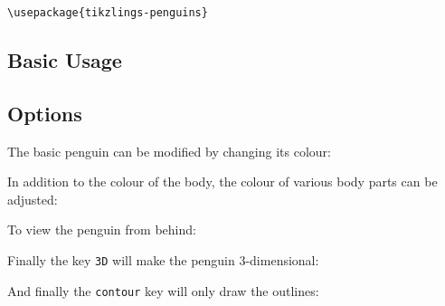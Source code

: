 \documentclass[parskip=half]{scrartcl}
\begin{document}
\begin{tcolorbox}[lower separated=false, lefthand width=.8\linewidth]
\vspace*{0.5cm}
\lstinline|\usepackage{tikzlings-penguins}| 
\vspace*{0.5cm}
\end{tcolorbox}

\subsection{Basic Usage}

\begin{tcblisting}{}
\penguin
\end{tcblisting}

\subsection{Options}

The basic penguin can be modified by changing its colour:
\begin{tcblisting}{}
\penguin[body=blue]
\end{tcblisting}

In addition to the colour of the body, the colour of various body parts can be adjusted:
\begin{tcblisting}{}
\penguin[eye=red]
\end{tcblisting}
\begin{tcblisting}{}
\penguin[pupil=red]
\end{tcblisting}
\begin{tcblisting}{}
\penguin[bill=red]
\end{tcblisting}
\begin{tcblisting}{}
\penguin[belly=red]
\end{tcblisting}
\begin{tcblisting}{}
\penguin[feet=red]
\end{tcblisting}

To view the penguin from behind:
\begin{tcblisting}{}
\penguin[back]
\end{tcblisting}

Finally the key \lstinline|3D| will make the penguin 3-dimensional:
\begin{tcblisting}{}
\penguin[3D]
\end{tcblisting}

And finally the \lstinline|contour| key will only draw the outlines:
\begin{tcblisting}{}
\penguin[contour=black]
\end{tcblisting}
\end{document}
